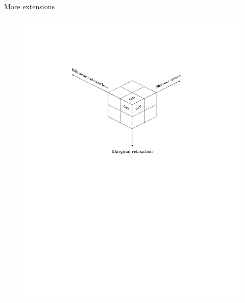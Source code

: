 \documentclass{beamer}
\begin{document}
\begin{frame}{More extensions}
  \scriptsize
  \begin{minipage}[t]{0.5\linewidth}

  \end{minipage}%
  \hfill%
  \hspace{-6cm}
  \begin{minipage}[t]{0.8\linewidth}
    \vspace{-2cm}
  \begin{figure}
    \centering
    \includegraphics[width=1.2\linewidth, keepaspectratio=true]{OT_new/cube_direction.pdf}
  \end{figure}
  \end{minipage}
\end{frame}
\end{document}
